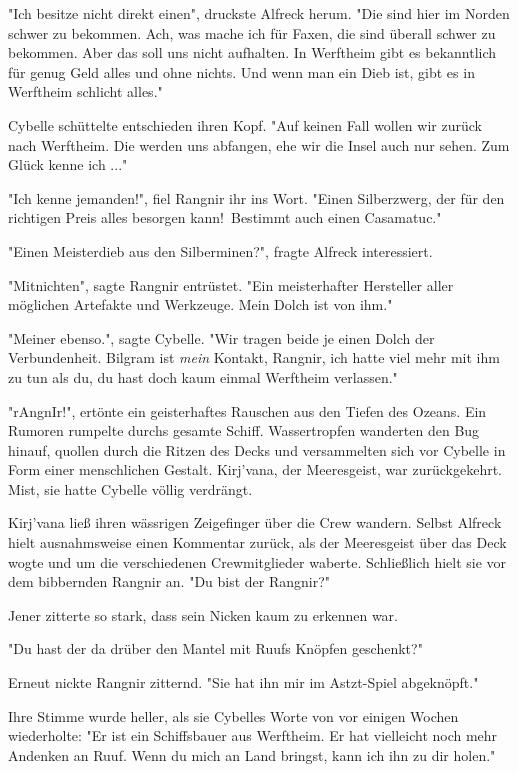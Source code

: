 "Ich besitze nicht direkt einen", druckste Alfreck herum. "Die sind hier im Norden schwer zu bekommen. Ach, was mache ich für Faxen, die sind überall schwer zu bekommen. Aber das soll uns nicht aufhalten. In Werftheim gibt es bekanntlich für genug Geld alles und ohne nichts. Und wenn man ein Dieb ist, gibt es in Werftheim schlicht alles."

Cybelle schüttelte entschieden ihren Kopf. "Auf keinen Fall wollen wir zurück nach Werftheim. Die  werden uns abfangen, ehe wir die Insel auch nur sehen. Zum Glück kenne ich ..."

"Ich kenne jemanden!", fiel Rangnir ihr ins Wort. "Einen Silberzwerg, der für den richtigen Preis alles besorgen kann! Bestimmt auch einen Casamatuc."

"Einen Meisterdieb aus den Silberminen?", fragte Alfreck interessiert.

"Mitnichten", sagte Rangnir entrüstet. "Ein meisterhafter Hersteller aller möglichen Artefakte und Werkzeuge. Mein Dolch ist von ihm."

"Meiner ebenso.", sagte Cybelle. "Wir tragen beide je einen Dolch der Verbundenheit. Bilgram ist \textit{mein} Kontakt, Rangnir, ich hatte viel mehr mit ihm zu tun als du, du hast doch kaum einmal Werftheim verlassen."

"rAngnIr!", ertönte ein geisterhaftes Rauschen aus den Tiefen des Ozeans. Ein Rumoren rumpelte durchs gesamte Schiff. Wassertropfen wanderten den Bug hinauf, quollen durch die Ritzen des Decks und versammelten sich vor Cybelle in Form einer menschlichen Gestalt. Kirj'vana, der Meeresgeist, war zurückgekehrt. Mist, sie hatte Cybelle völlig verdrängt.

Kirj'vana ließ ihren wässrigen Zeigefinger über die Crew wandern. Selbst Alfreck hielt ausnahmsweise einen Kommentar zurück, als der Meeresgeist über das Deck wogte und um die verschiedenen Crewmitglieder waberte. Schließlich hielt sie vor dem bibbernden Rangnir an. "Du bist der Rangnir?"

Jener zitterte so stark, dass sein Nicken kaum zu erkennen war.

"Du hast der da drüber den Mantel mit Ruufs Knöpfen geschenkt?"

Erneut nickte Rangnir zitternd. "Sie hat ihn mir im Astzt-Spiel abgeknöpft."

Ihre Stimme wurde heller, als sie Cybelles Worte von vor einigen Wochen wiederholte: "Er ist ein Schiffsbauer aus Werftheim. Er hat vielleicht noch mehr Andenken an Ruuf. Wenn du mich an Land bringst, kann ich ihn zu dir holen."

